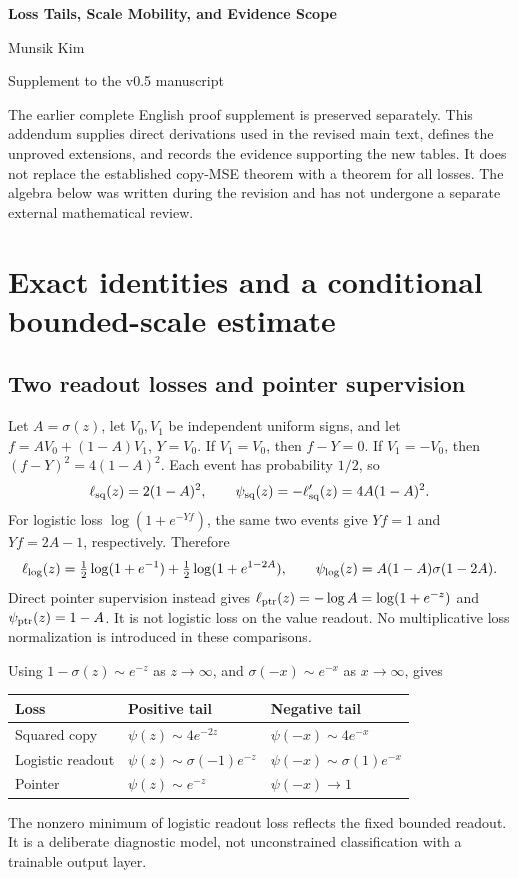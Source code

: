 \documentclass[10pt,a4paper]{article}
\begin{document}
\begin{center}{\Large\bfseries Loss Tails, Scale Mobility, and Evidence Scope}\par\vspace{5pt}Munsik Kim\par\vspace{5pt}Supplement to the v0.5 manuscript\end{center}
The earlier complete English proof supplement is preserved separately. This addendum supplies direct derivations used in the revised main text, defines the unproved extensions, and records the evidence supporting the new tables. It does not replace the established copy-MSE theorem with a theorem for all losses. The algebra below was written during the revision and has not undergone a separate external mathematical review.
\appendix
\section{Exact identities and a conditional bounded-scale estimate}
\subsection{Two readout losses and pointer supervision}
Let $A=\sigma(z)$, let $V_0,V_1$ be independent uniform signs, and let $f=AV_0+(1-A)V_1$, $Y=V_0$. If $V_1=V_0$, then $f-Y=0$. If $V_1=-V_0$, then $(f-Y)^2=4(1-A)^2$. Each event has probability $1/2$, so
\[
\ell_{\rm sq}(z)=2(1-A)^2,\qquad \psi_{\rm sq}(z)=-\ell'_{\rm sq}(z)=4A(1-A)^2.
\]
For logistic loss $\log(1+e^{-Yf})$, the same two events give $Yf=1$ and $Yf=2A-1$, respectively. Therefore
\[
\ell_{\rm log}(z)=\tfrac12\log(1+e^{-1})+\tfrac12\log(1+e^{1-2A}),\qquad
\psi_{\rm log}(z)=A(1-A)\sigma(1-2A).
\]
Direct pointer supervision instead gives $\ell_{\rm ptr}(z)=-\log A=\log(1+e^{-z})$ and $\psi_{\rm ptr}(z)=1-A$. It is not logistic loss on the value readout. No multiplicative loss normalization is introduced in these comparisons.

Using $1-\sigma(z)\sim e^{-z}$ as $z\to\infty$, and $\sigma(-x)\sim e^{-x}$ as $x\to\infty$, gives
\begin{center}
\begin{tabular}{@{}lll@{}}\toprule
Loss & Positive tail & Negative tail\\\midrule
Squared copy & $\psi(z)\sim4e^{-2z}$ & $\psi(-x)\sim4e^{-x}$\\
Logistic readout & $\psi(z)\sim\sigma(-1)e^{-z}$ & $\psi(-x)\sim\sigma(1)e^{-x}$\\
Pointer & $\psi(z)\sim e^{-z}$ & $\psi(-x)\to1$\\\bottomrule
\end{tabular}
\end{center}
The nonzero minimum of logistic readout loss reflects the fixed bounded readout. It is a deliberate diagnostic model, not unconstrained classification with a trainable output layer.
\end{document}
